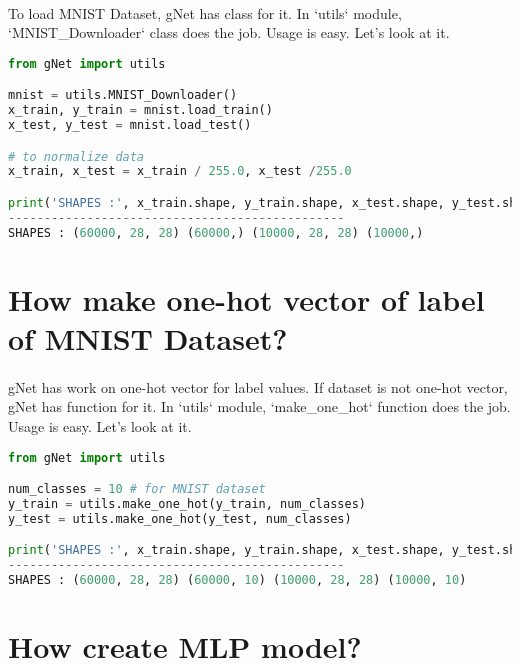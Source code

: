 \documentclass[12pt]{report}
\begin{document}
\paragraph{}
To load MNIST Dataset, gNet has class for it. In `utils` module, `MNIST\_Downloader` class does the job. Usage is easy. Let's look at it.

\begin{lstlisting}[language=Python, numbers=none, caption={Load MNIST Dataset.}, label={ex:mnist-load}]
from gNet import utils

mnist = utils.MNIST_Downloader()
x_train, y_train = mnist.load_train()
x_test, y_test = mnist.load_test()

# to normalize data
x_train, x_test = x_train / 255.0, x_test /255.0

print('SHAPES :', x_train.shape, y_train.shape, x_test.shape, y_test.shape)
-----------------------------------------------
SHAPES : (60000, 28, 28) (60000,) (10000, 28, 28) (10000,)
\end{lstlisting}



\section{How make one-hot vector of label of MNIST Dataset?}
\paragraph{}
gNet has work on one-hot vector for label values. If dataset is not one-hot vector, gNet has function for it. In `utils` module, `make\_one\_hot` function does the job. Usage is easy. Let's look at it.

\begin{lstlisting}[language=Python, numbers=none, caption={Making one-hot vector of label of dataset.}, label={ex:make-one-hot}]
from gNet import utils

num_classes = 10 # for MNIST dataset
y_train = utils.make_one_hot(y_train, num_classes)
y_test = utils.make_one_hot(y_test, num_classes)

print('SHAPES :', x_train.shape, y_train.shape, x_test.shape, y_test.shape)
-----------------------------------------------
SHAPES : (60000, 28, 28) (60000, 10) (10000, 28, 28) (10000, 10)
\end{lstlisting}



\section{How create MLP model?}
\end{document}
